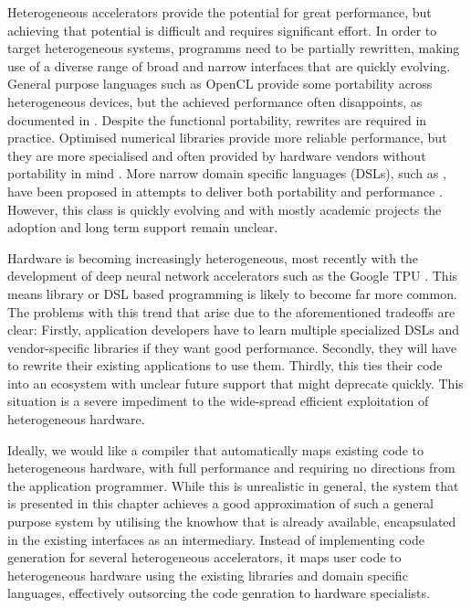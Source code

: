    Heterogeneous accelerators provide the potential for great performance, but
    achieving that potential is difficult and requires significant effort.
    In order to target heterogeneous systems, programms need to be partially
    rewritten, making use of a diverse range of broad and narrow interfaces that 
    are quickly evolving.
    General purpose languages such as OpenCL \citep{nvidia11guide} provide
    some portability across heterogeneous devices, but the achieved performance
    often disappoints, as documented in \citet{lee09openmp}.
    Despite the functional portability, rewrites are required in practice.
    Optimised numerical libraries provide more reliable performance, but they
    are more specialised and often provided by hardware vendors without
    portability in mind \citep{clblas,cublas,cusparse,clsparse}.
    More narrow domain specific languages (DSLs), such as \citet{Franchetti09OL,
    Rompf:2012:LMS:2184319.2184345}, have been proposed in attempts to deliver
    both portability and performance \citep{Ragan-Kelley2013Halide}.
    However, this class is quickly evolving and with mostly academic projects
    the adoption and long term support remain unclear.

    Hardware is becoming increasingly heterogeneous, most recently with the
    development of deep neural network accelerators such as the Google TPU
    \citep{jouppi2017datacenter}.
    This means library or DSL based programming is likely to become far more
    common.
    The problems with this trend that arise due to the aforementioned tradeoffs
    are clear:
    Firstly, application developers have to learn multiple specialized DSLs and
    vendor-specific libraries if they want good performance.
    Secondly, they will have to rewrite their existing applications to use them.
    Thirdly, this ties their code into an ecosystem with unclear future support
    that might deprecate quickly.
    This situation is a severe impediment to the wide-spread efficient
    exploitation of heterogeneous hardware.

    Ideally, we would like a compiler that automatically maps existing code to
    heterogeneous hardware, with full performance and requiring no directions
    from the application programmer.
    While this is unrealistic in general, the system that is presented in this
    chapter achieves a good approximation of such a general purpose system by
    utilising the knowhow that is already available, encapsulated in the
    existing interfaces as an intermediary.
    Instead of implementing code generation for several heterogeneous
    accelerators, it maps user code to heterogeneous hardware using the
    existing libraries and domain specific languages, effectively outsorcing the
    code genration to hardware specialists.

